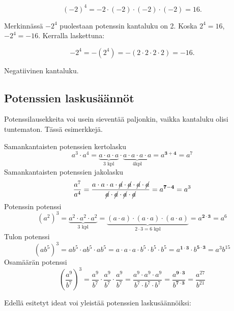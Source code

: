 \[ (-2)^4 = -2 \cdot (-2)\cdot(-2)\cdot(-2) = 16. \]

Merkinnässä $-2^4$ puolestaan potenssin kantaluku on 2. Koska $2^4 = 16$,
$-2^4=-16$. Kerralla laskettuna:     

\[ -2^4 =-(2^4)= -(2 \cdot 2\cdot 2 \cdot 2) = -16. \]          
            
    \begin{esimerkki}
        Negatiivinen kantaluku.
        \begin{alakohdat}
         \end{alakohdat}
    \end{esimerkki}
    
    
\subsection*{Potenssien laskusäännöt}

Potenssilausekkeita voi usein sieventää paljonkin, vaikka kantaluku
olisi tuntematon. Tässä esimerkkejä.    
    
    Samankantaisten potenssien kertolasku
	\[
a^3\cdot a^4=\underbrace{a\cdot a\cdot a}_{\text{3 kpl}}\cdot \underbrace{a\cdot a\cdot a\cdot a}_{\text{4kpl}}=a^{\mathbf{3+4}}=a^7
    	\]
    Samankantaisten potenssien jakolasku
	\[
\frac{a^7}{a^4}=\frac{a\cdot a\cdot a\cdot \cancel{a}\cdot \cancel{a}\cdot \cancel{a}\cdot \cancel{a}}	{\cancel{a}\cdot \cancel{a}\cdot \cancel{a}\cdot \cancel{a}}=a^{\mathbf{7-4}}=a^3
    	\]
    Potenssin potenssi
	\[
(a^2)^3=\underbrace{a^2\cdot a^2\cdot a^2}_{3\text{ kpl}}=
\underbrace{(a\cdot a)\cdot (a\cdot a)\cdot (a\cdot a)}_{2\cdot 3=6\text{ kpl}}=a^{\boldsymbol{{2\cdot 3}}}=a^6
\]
    Tulon potenssi
	\[
(ab^5)^3=ab^5\cdot ab^5\cdot ab^5=a\cdot a\cdot a\cdot b^5\cdot b^5\cdot b^5=a^{\mathbf{1\cdot 3}}\cdot b^{\mathbf{5\cdot 3}}=a^3b^{15}
	\]
     Osamäärän potenssi
	\[
	\left(\frac{a^9}{b^7}\right)^3=\frac{a^9}{b^7}\cdot \frac{a^9}{b^7}\cdot \frac{a^9}{b^7}=\frac{a^9\cdot a^9\cdot a^9}{b^7\cdot b^7\cdot b^7}=\frac{a^{\mathbf{9\cdot 3}}}{b^{\mathbf{7\cdot 3}}}=\frac{a^{27}}{b^{21}}
	\]

 Edellä esitetyt ideat voi yleistää potenssien laskusäännöiksi:
    
